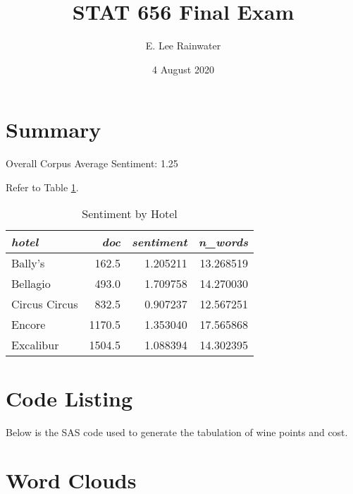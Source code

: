 \documentclass[12pt]{article}
\title{STAT 656 Final Exam}
\author{E. Lee Rainwater}
\date{4 August 2020}
\begin{document}
\maketitle

\section{Summary}
Overall Corpus Average Sentiment: 1.25

Refer to Table \ref{tab:hotelSentiment}.

\begin{table}[htbp]
  \centering
  \caption{Sentiment by Hotel}
   \begin{tabular}{lrrr}   
	\textit{hotel} & \textit{doc} & \textit{sentiment} & \textit{n\_words}\\	
	\hline
	Bally's &        162.5 &  1.205211 & 13.268519\\
	Bellagio &       493.0 &  1.709758 & 14.270030\\
	Circus Circus &  832.5 &  0.907237 & 12.567251\\
	Encore &        1170.5 &  1.353040 & 17.565868\\
	Excalibur &     1504.5 &  1.088394 & 14.302395\\
    \hline
    \end{tabular}%
  \label{tab:hotelSentiment}%
\end{table}%

\section{Code Listing}
Below is the SAS code used to generate the tabulation of wine points and cost.

{\tiny{}}

%




\section{Word Clouds}
\end{document}
